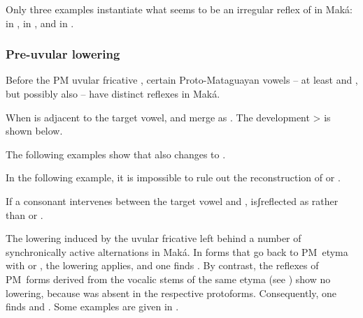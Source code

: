 Only three examples instantiate what seems to be an irregular reflex of  in Maká:  in ,  in , and  in .

\begin{exe}
    \ex \soul \label{mk-ao-soul}
    \ex \eyelash \label{mk-ao-eyelash}
    \ex \carrysh \label{mk-ao-carrysh}
\end{exe}

\subsubsection{Pre-uvular lowering} \label{mk-uvul-retr}

Before the PM uvular fricative , certain Proto-Mataguayan vowels -- at least  and , but possibly also  -- have distinct reflexes in Maká.

When  is adjacent to the target vowel,  and  merge as . The development  >  is shown below.

\begin{exe}
    \ex \ocelot
    \ex \runv
    \ex \oldn
    \ex \pseudo
    \ex \night
    \ex \tsofatajf
    \ex \piranhamn
    \ex \tuscaf
\end{exe}

The following examples show that  also changes to .

\begin{exe}
    \ex \blackalgarrobof
    \ex \hurt
    \ex \wildbean
    \ex \mollef
\end{exe}

In the following example, it is impossible to rule out the reconstruction of  or .

\begin{exe}
    \ex \dividev
\end{exe}

If a consonant intervenes between the target vowel and ,  isʃreflected as  rather than  or .

\begin{exe}
    \ex \redquebracho
\end{exe}

The lowering induced by the uvular fricative left behind a number of synchronically active alternations in Maká. In forms that go back to PM~etyma with  or , the lowering applies, and one finds . By contrast, the reflexes of PM~forms derived from the vocalic stems of the same etyma (see ) show no lowering, because  was absent in the respective protoforms. Consequently, one finds  and . Some examples are given in .

